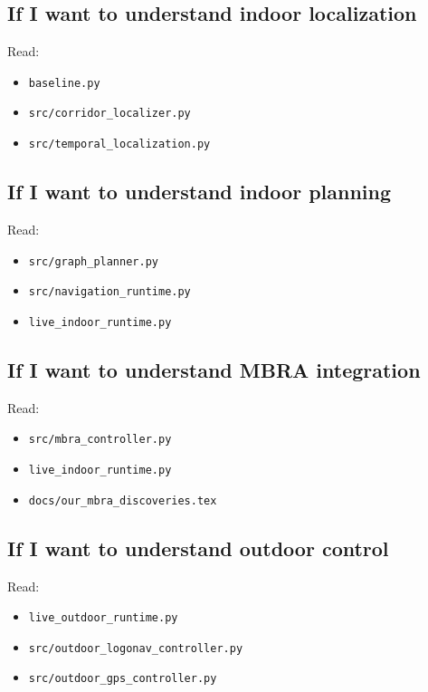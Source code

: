 \documentclass[11pt]{article}
\begin{document}
\subsection*{If I want to understand indoor localization}

Read:

\begin{itemize}[nosep]
  \item \texttt{baseline.py}
  \item \texttt{src/corridor\_localizer.py}
  \item \texttt{src/temporal\_localization.py}
\end{itemize}

\subsection*{If I want to understand indoor planning}

Read:

\begin{itemize}[nosep]
  \item \texttt{src/graph\_planner.py}
  \item \texttt{src/navigation\_runtime.py}
  \item \texttt{live\_indoor\_runtime.py}
\end{itemize}

\subsection*{If I want to understand MBRA integration}

Read:

\begin{itemize}[nosep]
  \item \texttt{src/mbra\_controller.py}
  \item \texttt{live\_indoor\_runtime.py}
  \item \texttt{docs/our\_mbra\_discoveries.tex}
\end{itemize}

\subsection*{If I want to understand outdoor control}

Read:

\begin{itemize}[nosep]
  \item \texttt{live\_outdoor\_runtime.py}
  \item \texttt{src/outdoor\_logonav\_controller.py}
  \item \texttt{src/outdoor\_gps\_controller.py}
\end{itemize}
\end{document}
